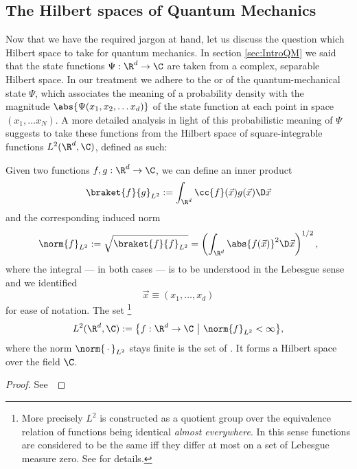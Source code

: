 \subsection{The Hilbert spaces of Quantum Mechanics}

Now that we have the required jargon at hand,
let us discuss the question which Hilbert space to take for quantum mechanics.
In section \ref{sec:IntroQM} we said that the state functions
$\Psi : \R^d \to \C$ are taken from a complex, separable Hilbert space.
In our treatment we adhere to the
 or 
of the quantum-mechanical state $\Psi$,
which associates the meaning of a probability density
with the magnitude $\abs{\Psi(x_1, x_2, \ldots x_d)}$
of the state function at each point in space $(x_1, \ldots x_N)$.
A more detailed analysis in light of this probabilistic meaning of $\Psi$
suggests to take these functions from the Hilbert space of square-integrable functions
$L^2(\R^d, \C)$, defined as such:

\begin{prop}
	\label{prop:L2HilbertSpace}
	Given two functions $f, g : \R^d \to \C$,
	we can define an inner product
	\begin{equation}
		\braket{f}{g}_{L^2} := \int_{\R^d} \cc{f}(\vec{x}) g(\vec{x}) \D \vec{x}
		\label{eqn:defL2InnProd}
	\end{equation}
	and the corresponding induced norm
	\begin{equation}
		\norm{f}_{L^2} := \sqrt{\braket{f}{f}_{L^2}} = \left( \int_{\R^d} \abs{f(\vec{x})}^2 \D \vec{x} \right)^{1/2},
		\label{eqn:defL2Norm}
	\end{equation}
	where the integral --- in both cases --- is to be understood in the Lebesgue sense
	and we identified
	\[ \vec{x} \equiv (x_1, \ldots, x_d) \]
	for ease of notation. The set%
	\footnote{More precisely $L^2$ is constructed as a quotient group
		over the equivalence relation of functions being identical
		\textit{almost everywhere}. In this sense functions are considered
		to be the same iff they differ at most on a set of Lebesgue measure zero.
		See \cite{DiracNotation} for details.}
	\[ L^2(\R^d, \C) := \big\{ f : \R^d \to \C ~\big|~ \norm{f}_{L^2} < \infty \big\}, \]
	where the norm $\norm{\slot}_{L^2}$ stays finite
	is the set of .
	It forms a Hilbert space over the field $\C$.
	\begin{proof}
		See~\cite{Adams2003}
	\end{proof}
\end{prop}

